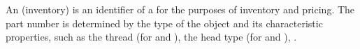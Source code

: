 \begin{module}[id=partnumber]

\begin{definition}[id=part-number.def]
  An (inventory)  is an identifier of a
   for the purposes of inventory and pricing. The part
  number is determined by the type of the object and its characteristic properties, such
  as the thread (for  and ), the
  head type (for and ), .
\end{definition}
\end{module}


